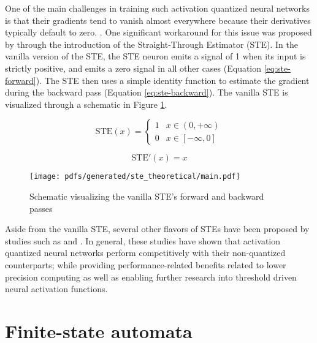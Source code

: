 One of the main challenges in training such activation quantized neural networks
is that their gradients tend to vanish almost everywhere because their
derivatives typically default to zero.
\citep{bengio2013estimating,courbariaux2016binarized,yin2019understanding}. One
significant workaround for this issue was proposed by
\citet{bengio2013estimating} through the introduction of the Straight-Through
Estimator (STE). In the vanilla version of the STE, the STE neuron emits a
signal of 1 when its input is strictly positive, and emits a zero signal in all
other cases (Equation \ref{eq:ste-forward}). The STE then uses a simple identity
function to estimate the gradient during the backward pass (Equation
\ref{eq:ste-backward}). The vanilla STE is visualized through a schematic in
Figure \ref{fig:straight-through-estimator}.

\begin{equation}
  \label{eq:ste-forward}
  \text{STE}(x)=
  \begin{cases}
    1 & x \in (0, +\infty) \\
    0 & x \in [-\infty, 0]
  \end{cases}
\end{equation}

\begin{equation}
  \label{eq:ste-backward}
  \text{STE}'(x)= x
\end{equation}

\begin{figure}[t]
  \centering
  \texttt{[image: pdfs/generated/ste\_theoretical/main.pdf]}
  \caption{Schematic visualizing the vanilla STE's forward and backward passes}
  \label{fig:straight-through-estimator}
\end{figure}

Aside from the vanilla STE, several other flavors of STEs have been proposed by
studies such as \citet{courbariaux2016binarized} and
\citet{yin2019understanding}. In general, these studies have shown that
activation quantized neural networks perform competitively with their
non-quantized counterparts; while providing performance-related benefits related
to lower precision computing as well as enabling further research into threshold
driven neural activation functions.

\section{Finite-state automata}

\label{section:fsa}

